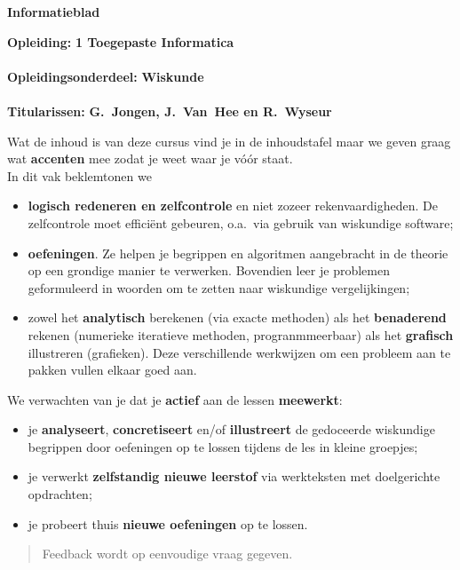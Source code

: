 \documentclass[11pt]{article}
\begin{document}
    \noindent
\newcommand{\groot}[1]{{\large{\bf #1}}}
\setlength{\fboxsep}{.7cm} \noindent
\begin{boxedminipage}{\textwidth}
\begin{center}{\Large{\bf Informatieblad}}\end{center}
\groot{Opleiding:} {\bf 1 Toegepaste Informatica} \\ \\
\groot{Opleidingsonderdeel:} {\bf Wiskunde} \\ \\
\groot{Titularissen:} {\bf G.~Jongen, J.~Van~Hee en R.~Wyseur}
\end{boxedminipage}

\vspace{0.7cm} \noindent
    Wat de inhoud is van deze cursus vind je in de inhoudstafel maar
    we geven graag wat \textbf{accenten} mee zodat je weet waar je
    v\'{o}\'{o}r  staat.\\

    \noindent
    In dit vak beklemtonen we
    \begin{itemize}
    \item \textbf{logisch redeneren en zelfcontrole} en niet zozeer rekenvaardigheden.
    De zelfcontrole moet effici\"{e}nt gebeuren, o.a.\ via gebruik van wiskundige
    software;

    \item \textbf{oefeningen}. Ze helpen je begrippen
    en algoritmen aangebracht in de theorie op een grondige manier
    te verwerken. Bovendien leer je problemen geformuleerd in woorden
    om te zetten naar wiskundige vergelijkingen;

    \item  zowel het \textbf{analytisch} berekenen (via exacte
    methoden) als  het \textbf{benaderend} rekenen (numerieke iteratieve methoden,
    progranmmeerbaar) als het \textbf{grafisch} illustreren
    (grafieken). Deze verschillende werkwijzen om een
    probleem aan te pakken vullen elkaar goed aan.

    \end{itemize}

    \noindent
    We verwachten van je dat je \textbf{actief} aan de lessen \textbf{meewerkt}:
    \begin{itemize}
      \item je \textbf{analyseert}, \textbf{concretiseert}
      en/of \textbf{illustreert} de gedoceerde wiskundige begrippen door
      oefeningen op te lossen tijdens de les in kleine groepjes;
        \item je verwerkt \textbf{zelfstandig nieuwe leerstof}
        via werkteksten met doelgerichte opdrachten;
        \item je probeert thuis \textbf{nieuwe oefeningen}
        op te lossen.
    \end{itemize}
    \begin{quote}
    Feedback wordt op eenvoudige vraag gegeven.
    \end{quote}
\end{document}
